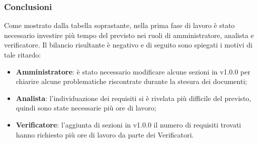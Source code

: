 \break

\subsubsection{Conclusioni}
Come mostrato dalla tabella soprastante, nella prima fase di lavoro è stato necessario investire più tempo del previsto nei ruoli di amministratore, analista e verificatore.\break
Il bilancio risultante è negativo e di seguito sono spiegati i motivi di tale ritardo:
\begin{itemize}
	\item \textbf{Amministratore}: è stato necessario modificare alcune sezioni in  v1.0.0 per chiarire alcune problematiche riscontrate durante la stesura dei documenti;
	\item \textbf{Analista}: l’individuazione dei requisiti si è rivelata più difficile del previsto, quindi sono state necessarie più ore di lavoro;
	\item \textbf{Verificatore}: l’aggiunta di sezioni in  v1.0.0 il numero di requisiti trovati hanno richiesto più ore di lavoro da parte dei Verificatori.
\end{itemize}
	\newpage